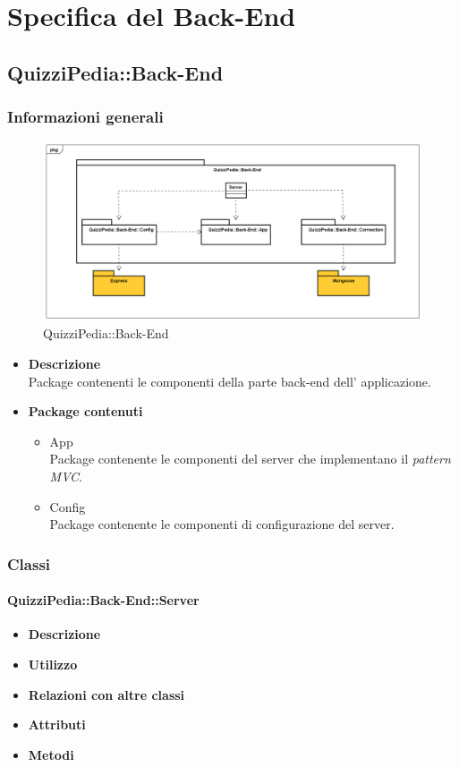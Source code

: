 \newpage
\section{Specifica del Back-End}
\subsection{QuizziPedia::Back-End}
\subsubsection{Informazioni generali}
\label{QuizziPedia::Back-End}
\begin{figure}
	\centering
	\includegraphics[scale=0.45]{UML/Package/QuizziPedia_Back-End.png}
	\caption{QuizziPedia::Back-End}
\end{figure}

	\begin{itemize}
		\item \textbf{Descrizione} \\ Package contenenti le componenti della parte back-end dell' applicazione.
		\item \textbf{Package contenuti}
		\begin{itemize}
			\item App \\
			Package contenente le componenti del server che implementano il \textit{pattern MVC}.
			\item Config \\
			Package contenente le componenti di configurazione del server.
		\end{itemize}
	\end{itemize}
\subsubsection{Classi}
	\paragraph{QuizziPedia::Back-End::Server}
	\begin{itemize}
		\item \textbf{Descrizione}
		\item \textbf{Utilizzo}
		\item \textbf{Relazioni con altre classi}
		\item \textbf{Attributi}
		\item \textbf{Metodi}
	\end{itemize}

